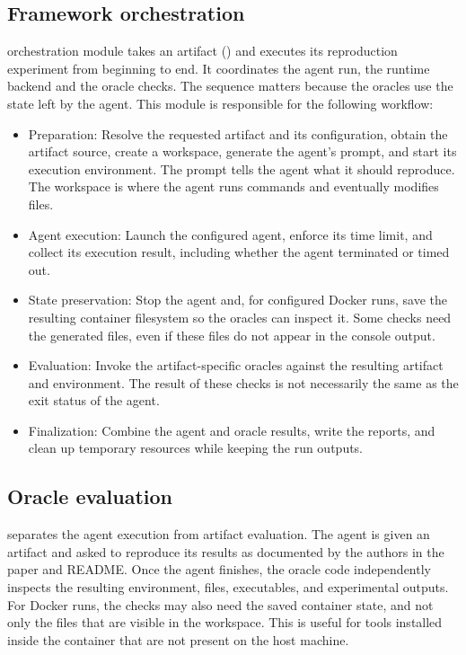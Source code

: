 \subsection{Framework orchestration}

\aebench orchestration module takes an artifact ()
  and executes its reproduction experiment from beginning to end.
It coordinates the agent run, the runtime backend and the oracle checks.
The sequence matters because the oracles use the state left by the agent.
This module is responsible for the following workflow:
\begin{itemize}
  \item Preparation: Resolve the requested artifact and its configuration, obtain 
    the artifact source, create a workspace,
    generate the agent's prompt, and start its execution environment.
    The prompt tells the agent what it should reproduce.
    The workspace is where the agent runs commands and eventually modifies files.
  \item Agent execution: Launch the configured agent, enforce its time limit,
    and collect its execution result, including whether the agent terminated or timed out.
  \item State preservation: Stop the agent and, for configured Docker runs, save the
    resulting container filesystem so the oracles can inspect it.
    Some checks need the generated files, even if these files do not appear in the console output.
  \item Evaluation: Invoke the artifact-specific oracles against the
    resulting artifact and environment.
    The result of these checks is not necessarily the same as the exit status of the agent.
  \item Finalization: Combine the agent and oracle results, write the reports,
    and clean up temporary resources while keeping the run outputs.
\end{itemize}

\subsection{Oracle evaluation}

\aebench separates the agent execution from artifact evaluation.
The agent is given an artifact and asked to reproduce its results as documented
  by the authors in the paper and README.
Once the agent finishes, the oracle code independently inspects the resulting
  environment, files, executables, and experimental outputs.
For Docker runs, the checks may also need the saved container state,
  and not only the files that are visible in the workspace.
This is useful for tools installed inside the container that are not 
  present on the host machine.

